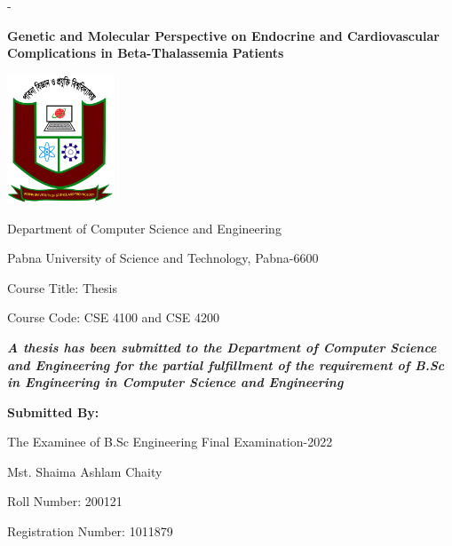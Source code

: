 \setlength{\parskip}{0pt}
%
\begin{titlingpage}
\begin{SingleSpace}
\calccentering{\unitlength} 
\begin{adjustwidth*}{\unitlength}{-\unitlength}

\begin{center}
    {\Large \textbf{Genetic and Molecular Perspective on Endocrine and Cardiovascular Complications in Beta-Thalassemia Patients}}
\end{center}

\vspace{0.5cm}

\begin{center}
\includegraphics[width=32mm]{logos/pust_logo.jpg} %

Department of Computer Science and Engineering

Pabna University of Science and Technology, Pabna-6600

\vspace{0.5cm}

Course Title: Thesis

Course Code: CSE 4100 and CSE 4200


\vspace{0.5cm}

{\em \textbf{A thesis has been submitted to the Department of Computer Science and Engineering for the partial fulfillment of the requirement of B.Sc in Engineering in Computer Science and Engineering}
}

\vspace{1cm}
{\textbf {Submitted By:}}

The Examinee of B.Sc Engineering Final Examination-2022

Mst. Shaima Ashlam Chaity

Roll Number: 200121

Registration Number: 1011879


\end{center}
\end{adjustwidth*}
\end{SingleSpace}
\end{titlingpage}

